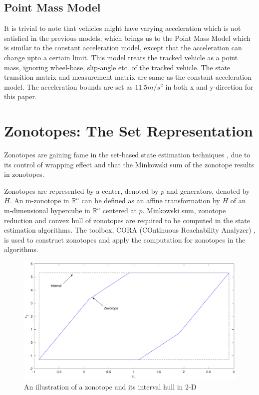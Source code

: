 \subsection{Point Mass Model}
It is trivial to note that vehicles might have varying acceleration which is not satisfied in the previous models, which brings us to the Point Mass Model\cite{Althoff} which is similar to the constant acceleration model, except that the acceleration can change upto a certain limit. This model treats the tracked vehicle as a point mass, ignoring wheel-base, slip-angle etc. of the tracked vehicle. The state transition matrix and measurement matrix are same as the constant acceleration model. The acceleration bounds are set as $11.5 m/s^2$ in both x and y-direction for this paper.

\section{Zonotopes: The Set Representation}
Zonotopes are gaining fame in the set-based state estimation techniques \cite{Le2013}, due to its control of wrapping effect and that the Minkowski sum of the zonotope results in zonotopes.

Zonotopes are represented by a center, denoted by $p$ and generators, denoted by $H$. An m-zonotope in $\mathbb{R}^n$ can be defined as an affine transformation by $H$ of an m-dimensional hypercube in $\mathbb{R}^n$ centered at $p$. Minkowski sum, zonotope reduction and convex hull of zonotopes are required to be computed in the state estimation algorithms. The toolbox, CORA (COntinuous Reachability Analyzer) \cite{Althoff2018}, is used to construct zonotopes and apply the computation for zonotopes in the algorithms. 
\begin{figure}[!h]
\label{fig:zonotope}
\includegraphics[scale=.25]{figures/zonotope}
\caption{An illustration of a zonotope and its interval hull in 2-D}
\end{figure}
